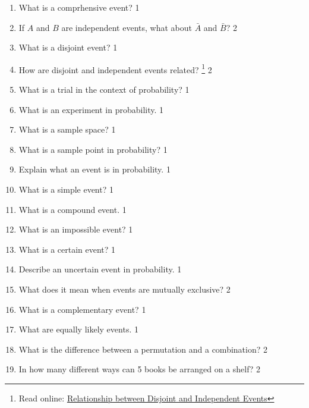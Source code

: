 \documentclass[a4paper,oneside, margin=1.4in]{book}
\begin{document}
 \begin{enumerate}
 
 \item What is a comprhensive event? \hfill 1
 \item If $A$ and $B$ are independent events, what about $\bar A$ and $\bar B$? \hfill 2
    \item
	What is a disjoint event? \hfill 1
    \item
	How are disjoint and independent events related? \footnote{Read online: \href{https://study.statmania.info/disjint-independent-relation.sm}{Relationship between Disjoint and Independent Events}}  \hfill 2

 
    \item What is a trial in the context of probability? \hfill 1

\item What is an experiment in probability. \hfill 1

\item What is a sample space? \hfill 1

\item What is a sample point in probability? \hfill 1

\item Explain what an event is in probability. \hfill 1

\item What is a simple event? \hfill 1

\item What is a compound event. \hfill 1

\item What is an impossible event? \hfill 1

\item What is a certain event? \hfill 1

\item Describe an uncertain event in probability. \hfill 1

\item What does it mean when events are mutually exclusive? \hfill 2

\item What is a complementary event? \hfill 1

\item What are equally likely events. \hfill 1

\item What is the difference between a permutation and a combination? \hfill 2

\item In how many different ways can 5 books be arranged on a shelf? \hfill 2


\end{enumerate}
\end{document}
